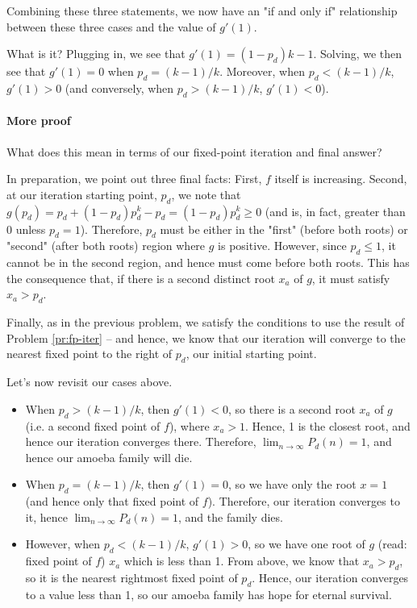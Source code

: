 
Combining these three statements, we now have an "if and only if" relationship between these three cases and the value of $g'(1)$. 

What is it? Plugging in, we see that $g'(1) = (1 - p_d)k - 1$. Solving, we then see that $g'(1) = 0$ when $p_d = (k-1)/k$. Moreover, when $p_d < (k-1)/k$, $g'(1) > 0$ (and conversely, when $p_d > (k-1)/k$, $g'(1) < 0$). 

\paragraph{More proof}

What does this mean in terms of our fixed-point iteration and final answer?

In preparation, we point out three final facts: First, $f$ itself is increasing. Second, at our iteration starting point, $p_d$, we note that $g(p_d) = p_d + (1 - p_d)p_d^k - p_d = (1 - p_d)p_d^k \geq 0$ (and is, in fact, greater than 0 unless $p_d = 1$). Therefore, $p_d$ must be either in the "first" (before both roots) or "second" (after both roots) region where $g$ is positive. However, since $p_d \leq 1$, it cannot be in the second region, and hence must come before both roots. This has the consequence that, if there is a second distinct root $x_a$ of $g$, it must satisfy $x_a > p_d$. 


Finally, as in the previous problem, we satisfy the conditions to use the result of Problem \ref{pr:fp-iter} -- and hence, we know that our iteration will converge to the nearest fixed point to the right of $p_d$, our initial starting point.

Let's now revisit our cases above. 

\begin{itemize}
\item When $p_d > (k-1)/k$, then $g'(1) < 0$, so there is a second root $x_a$ of $g$ (i.e. a second fixed point of $f$), where $x_a > 1$. Hence, 1 is the closest root, and hence our iteration converges there. Therefore, $\lim_{n \rightarrow \infty} P_d(n) = 1$, and hence our amoeba family will die. 
\item When $p_d = (k-1)/k$, then $g'(1) = 0$, so we have only the root $x = 1$ (and hence only that fixed point of $f$). Therefore, our iteration converges to it, hence $\lim_{n \rightarrow \infty} P_d(n) = 1$, and the family dies.
\item However, when $p_d < (k-1)/k$, $g'(1) > 0$, so we have one root of $g$ (read: fixed point of $f$) $x_a$ which is less than 1. From above, we know that $x_a > p_d$, so it is the nearest rightmost fixed point of $p_d$. Hence, our iteration converges to a value less than 1, so our amoeba family has hope for eternal survival. 
\end{itemize}

